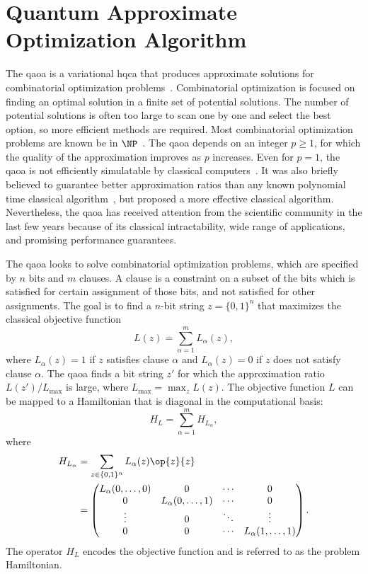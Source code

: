 \section{Quantum Approximate Optimization Algorithm} \label{sec:qaoa}
The \acrfull{qaoa} is a variational \gls{hqca} that produces approximate solutions for combinatorial optimization problems~\cite{farhi2014quantum}.
Combinatorial optimization is focused on finding an optimal solution in a finite set of potential solutions.
The number of potential solutions is often too large to scan one by one and select the best option, so more efficient methods are required.
Most combinatorial optimization problems are known be in $\NP$~\cite{schrijver2003combinatorial}.
The \gls{qaoa} depends on an integer $p \ge 1$, for which the quality of the approximation improves as $p$ increases.
Even for $p = 1$, the \gls{qaoa} is not efficiently simulatable by classical computers~\cite{farhi2016quantum}.
It was also briefly believed to guarantee better approximation ratios than any known polynomial time classical algorithm~\cite{farhi2014quantum}, but \textcite{barak2015beating} proposed a more effective classical algorithm.
Nevertheless, the \gls{qaoa} has received attention from the scientific community in the last few years because of its classical intractability, wide range of applications, and promising performance guarantees.

The \gls{qaoa} looks to solve combinatorial optimization problems, which are specified by $n$ bits and $m$ clauses.
A clause is a constraint on a subset of the bits which is satisfied for certain assignment of those bits, and not satisfied for other assignments.
The goal is to find a $n$-bit string $z = \{0,1\}^n$ that maximizes the classical objective function
\begin{equation} \label{eqn:objective-function}
L(z) = \sum_{\alpha=1}^m L_\alpha(z),
\end{equation}
where $L_\alpha(z) = 1$ if $z$ satisfies clause $\alpha$ and $L_\alpha(z) = 0$ if $z$ does not satisfy clause $\alpha$.
The \gls{qaoa} finds a bit string $z'$ for which the approximation ratio $L(z')/L_{\text{max}}$ is large, where $L_{\text{max}} = \max_z L(z)$.
The objective function $L$ can be mapped to a Hamiltonian that is diagonal in the computational basis:
\begin{equation}
H_L = \sum_{\alpha=1}^m H_{L_\alpha},
\end{equation}
where
\begin{align}
H_{L_\alpha} &= \sum_{z \in \{0, 1\}^n} L_\alpha(z) \op{z}{z} \\
&=
\begin{pmatrix}
L_\alpha(0,\ldots,0) & 0 & \cdots & 0 \\
0 & L_\alpha(0,\ldots,1) & \cdots & 0 \\
\vdots & 0 & \ddots & \vdots \\
0 & 0 & \cdots & L_\alpha(1,\ldots,1)
\end{pmatrix}.
\end{align}
The operator $H_L$ encodes the objective function and is referred to as the problem Hamiltonian.

